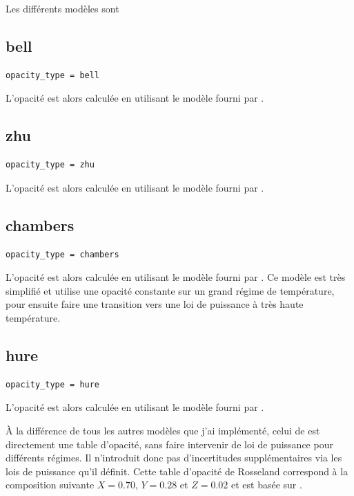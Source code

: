 Les différents modèles sont \citep{bell1994FU, zhu2009nonsteady, chambers2009analytic, hure2000transition}

\subsection{bell}
\begin{verbatim}
opacity_type = bell
\end{verbatim}

L'opacité est alors calculée en utilisant le modèle fourni par \cite{bell1994FU}. 

\subsection{zhu}
\begin{verbatim}
opacity_type = zhu
\end{verbatim}

L'opacité est alors calculée en utilisant le modèle fourni par \cite{zhu2009nonsteady}. 

\subsection{chambers}
\begin{verbatim}
opacity_type = chambers
\end{verbatim}

L'opacité est alors calculée en utilisant le modèle fourni par \cite{chambers2009analytic}. Ce modèle est très simplifié et
utilise une opacité constante sur un grand régime de température, pour ensuite faire une transition vers une loi de puissance à
très haute température.

\subsection{hure}
\begin{verbatim}
opacity_type = hure
\end{verbatim}

L'opacité est alors calculée en utilisant le modèle fourni par \cite{hure2000transition}. 

À la différence de tous les autres modèles que j'ai implémenté, celui de \cite{hure2000transition} est directement une table d'opacité, sans faire intervenir de loi de puissance pour différents régimes. Il n'introduit donc pas d'incertitudes supplémentaires via les lois de puissance qu'il définit. Cette table
d'opacité de Rosseland correspond à la composition suivante $X=0.70$, $Y=0.28$ et $Z=0.02$ et est basée sur
\cite{seaton1994opacities, alexander1994low, henning1996dust}.

